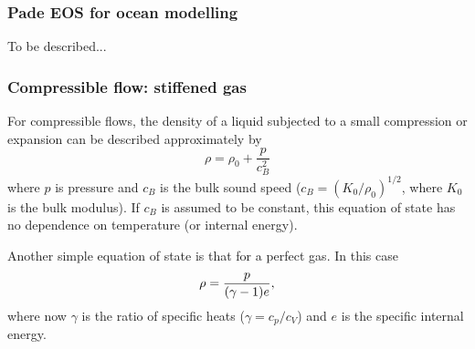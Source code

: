 

\subsubsection{Pade EOS for ocean modelling}\label{Sect:PadeDescription}
To be described...

\subsubsection{Compressible flow: stiffened gas}\label{Sect:StiffenedGas}
For compressible flows, the density of a liquid subjected to a small compression or expansion can be described approximately by
\begin{equation}
\rho = \rho_0 + \frac{p}{c_B^2}
\end{equation}
where $p$ is pressure and $c_B$ is the bulk sound speed ($c_B = (K_0/\rho_0)^{1/2}$, where $K_0$ is the bulk modulus). If $c_B$ is assumed to be constant, this equation of state has no dependence on temperature (or internal energy).

Another simple equation of state is that for a perfect gas. In this case
\begin{equation}
\rho = \frac{p}{(\gamma-1)e},
\end{equation}
where now $\gamma$ is the ratio of specific heats ($\gamma=c_p/c_V$) and $e$ is the specific internal energy.

